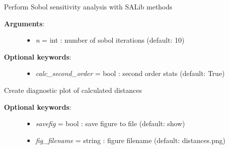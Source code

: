 \documentclass[a4paper,10pt,english]{sphinxmanual}
\begin{document}
\begin{fulllineitems}
\begin{fulllineitems}
\begin{description}
\begin{itemize}
\end{itemize}

\end{description}

\end{fulllineitems}


\begin{fulllineitems}
\label{pynoddy:pynoddy.experiment.SensitivityAnalysis.SensitivityAnalysis.perform_analsis}
Perform Sobol sensitivity analysis with SALib methods
\begin{description}
\item[{\textbf{Arguments}:}] \leavevmode\begin{itemize}
\item {} 
\emph{n} = int : number of sobol iterations (default: 10)

\end{itemize}

\item[{\textbf{Optional keywords}:}] \leavevmode\begin{itemize}
\item {} 
\emph{calc\_second\_order} = bool : second order stats (default: True)

\end{itemize}

\end{description}

\end{fulllineitems}


\begin{fulllineitems}
\label{pynoddy:pynoddy.experiment.SensitivityAnalysis.SensitivityAnalysis.plot_distances}
Create diagnostic plot of calculated distances
\begin{description}
\item[{\textbf{Optional keywords}:}] \leavevmode\begin{itemize}
\item {} 
\emph{savefig} = bool : save figure to file (default: show)

\item {} 
\emph{fig\_filename} = string : figure filename (default: distances.png)


\end{itemize}
\end{description}
\end{fulllineitems}
\end{fulllineitems}
\end{document}

